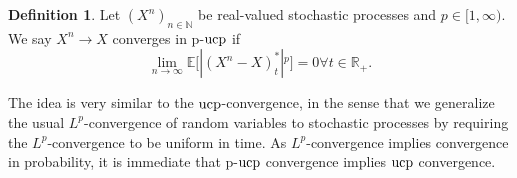 \documentclass[11pt,a4paper,twoside,openany]{report}
\numberwithin{equation}{section}
\theoremstyle{plain} %
\theoremstyle{definition} %
\newtheorem{definition}[theorem]{Definition}
\theoremstyle{remark} %
\begin{document}
\begin{definition}\label{def:p-UCP convergence}
    Let \((X^n)_{n\in\mathbb{N}}\) be real-valued stochastic processes and \(p\in[1,\infty)\). We say \(X^n\to X\) converges in p-\(\rm{ucp}\) if 
    \begin{equation*}
        \lim_{n\to\infty}\mathbb{E}\big[|(X^n-X)^*_t|{^p}\big]=0\forall t\in\mathbb{R}_+.
    \end{equation*} 
\end{definition}
The idea is very similar to the \(\rm{ucp}\)-convergence, in the sense that we generalize the usual \(L^p\)-convergence of random variables to stochastic processes by requiring the \(L^p\)-convergence to be uniform in time. As \(L^p\)-convergence implies convergence in probability, it is immediate that p-\(\rm{ucp}\) convergence implies \(\rm{ucp}\) convergence. 
\end{document}
